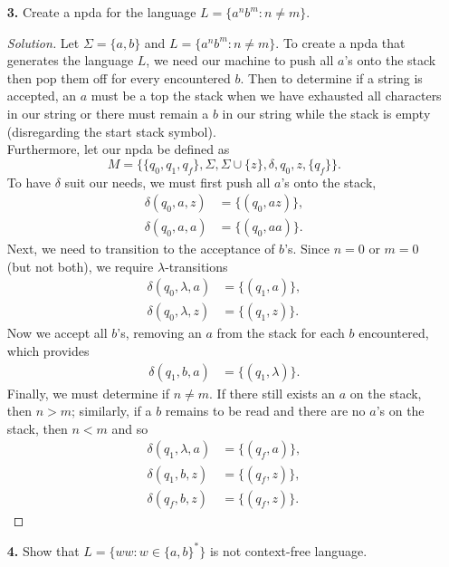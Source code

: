 \documentclass[ 12pt ]{article}
\begin{document}
\begin{enumerate}
	\item[\textbf{3.}] Create a npda for the language $L = \{ a^n b^m : n \neq m \}$.

		\begin{proof}[Solution]
			Let $\Sigma = \{ a, b \}$ and $L = \{ a^n b^m : n \neq m \}$. To create a npda that generates the language $L$, we need our machine to push all $a$'s onto the stack then pop
			them off for every encountered $b$. Then to determine if a string is accepted, an $a$ must be a top the stack when we have exhausted all characters in our string or there
			must remain a $b$ in our string while the stack is empty (disregarding the start stack symbol). \\

			Furthermore, let our npda be defined as $$M = \{ \{ q_0, q_1, q_f \}, \Sigma, \Sigma \cup \{ z \}, \delta, q_0, z, \{ q_f \} \}.$$ To have $\delta$ suit our needs, we must
			first push all $a$'s onto the stack,
			\begin{align*}
				\delta( q_0, a, z ) &= \{ (q_0, az) \}, \\
				\delta( q_0, a, a ) &= \{ (q_0, aa) \}.
			\end{align*}
			Next, we need to transition to the acceptance of $b$'s. Since $n = 0$ or $m = 0$ (but not both), we require $\lambda$-transitions
			\begin{align*}
				\delta( q_0, \lambda, a ) &= \{ (q_1, a) \}, \\
				\delta( q_0, \lambda, z ) &= \{ (q_1, z) \}.
			\end{align*}
			Now we accept all $b$'s, removing an $a$ from the stack for each $b$ encountered, which provides
			\begin{align*}
				\delta( q_1, b, a ) &= \{ (q_1, \lambda) \}.
			\end{align*}
			Finally, we must determine if $n \neq m$. If there still exists an $a$ on the stack, then $n > m$; similarly, if a $b$ remains to be read and there are no $a$'s on the stack,
			then $n < m$ and so
			\begin{align*}
				\delta( q_1, \lambda, a ) &= \{ (q_f, a) \}, \\
				\delta( q_1, b, z ) &= \{ (q_f, z) \}, \\
				\delta( q_f, b, z ) &= \{ (q_f, z) \}.
			\end{align*}
		\end{proof}


	\item[\textbf{4.}] Show that $L = \{ ww : w \in \{ a, b \}^* \}$ is not context-free language.


\end{enumerate}
\end{document}
